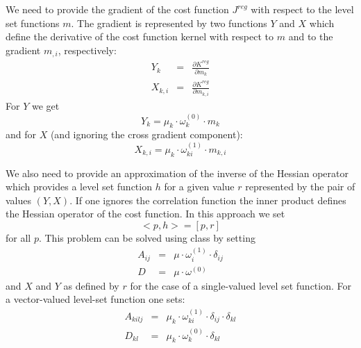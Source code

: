 We need to provide the gradient of the cost function $J^{reg}$  with respect to the level set functions $m$.
The gradient is represented by two functions $Y$ and $X$ which define the 
derivative of the cost function kernel with respect to $m$ and to the gradient $m_{,i}$, respectively:
\begin{equation}\label{ref:EQU:REG:101}
\begin{array}{rcl}
  Y_k & = & \displaystyle{\frac{\partial K^{reg}}{\partial m_k}} \\
   X_{k,i} & = & \displaystyle{\frac{\partial K^{reg}}{\partial m_{k,i}}} 
\end{array}
\end{equation} 
For $Y$ we get 
\begin{equation}\label{ref:EQU:REG:102}
Y_k = \mu_k \cdot \omega^{(0)}_k \cdot m_k
\end{equation} 
and for $X$ (and ignoring the cross gradient component):
\begin{equation}\label{ref:EQU:REG:103}
 X_{k,i} = \mu_k \cdot \omega^{(1)}_{ki} \cdot m_{k,i}
\end{equation}  


We also need to provide an approximation of the inverse of the Hessian operator which provides a 
level set function $h$ for a given value $r$ represented by the pair of values $(Y,X)$. If one ignores the correlation function
the inner product defines the Hessian operator of the cost function. In this approach we set 
\begin{equation}\label{EQU:REG:8}
 < p,   h > = [p, r]
\end{equation} 
for all $p$. This problem can be solved using \escript {} class by setting
\begin{equation}\label{EQU:REG:8b}
\begin{array}{rcl}
 A_{ij} & =&  \mu \cdot \omega^{(1)}_i \cdot \delta_{ij}  \\
D & = &  \mu \cdot \omega^{(0)} 
\end{array}
\end{equation} 
and $X$ and $Y$ as defined by $r$ for the case of a single-valued level set function.
For a vector-valued level-set function one sets:
\begin{equation}\label{EQU:REG:8c}
\begin{array}{rcl}
 A_{kilj} & = & \mu_k \cdot \omega^{(1)}_{ki} \cdot \delta_{ij} \cdot \delta_{kl}  \\
D_{kl} & =  &  \mu_k \cdot \omega^{(0)}_k \cdot \delta_{kl} 
\end{array}
\end{equation} 


